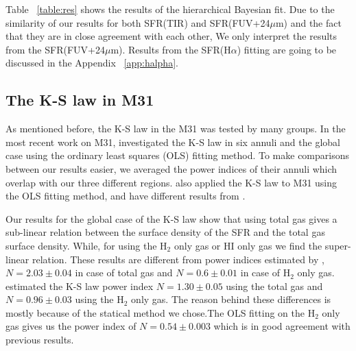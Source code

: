 \documentclass[useAMS,usenatbib]{mn2e}
\begin{document}


Table ~\ref{table:res} shows the results of the hierarchical Bayesian fit. Due to the similarity of our results for both SFR(TIR) and SFR(FUV+24$\mu$m) and the fact that they are in close agreement with each other, 
We only interpret the results from the SFR(FUV+24$\mu$m). Results from the SFR(H$\alpha$) fitting are going to be discussed in the Appendix ~\ref{app:halpha}. %

\subsection{The K-S law in M31}

As mentioned before, the K-S law in the M31 was tested by many groups. %
In the most recent work on M31, \cite{Ford13} investigated the K-S law in six annuli and the global case using the ordinary least squares (OLS) fitting method. To make comparisons between our results easier, we averaged the power indices of their annuli which overlap with our three different regions. \cite{Tabatabaei10} also applied the K-S law to M31 using the OLS fitting method, and have different results from \cite{Ford13}.

Our results for the global case of the K-S law show that using total gas gives a sub-linear relation between the surface density of the SFR and the total gas surface density. While, for using the H$_{2}$ only gas or HI only gas we find the super-linear relation. These results are different from power indices estimated by \cite{Ford13}, $N=2.03\pm0.04$ in case of total gas and $N=0.6\pm0.01$ in case of H$_{2}$ only gas. \cite{Tabatabaei10} estimated the K-S law power index $N=1.30\pm0.05$ using the total gas and $N=0.96\pm0.03$ using the H$_{2}$ only gas. The reason behind these differences is mostly because of the statical method we chose.The OLS fitting on the H$_{2}$ only gas gives us the power index of $N=0.54\pm0.003$ which is in good agreement with previous results.
\end{document}
